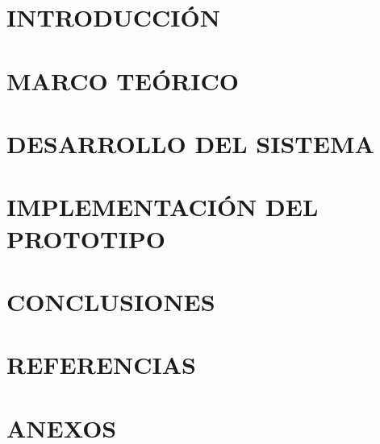 \documentclass[12pt]{article}
\begin{document}
\newpage


\setcounter{page}{1}
\renewcommand{\thepage}{\arabic{page}}

\section{INTRODUCCIÓN} \label{intro}


\newpage
\section{MARCO TEÓRICO}



\newpage
\section{DESARROLLO DEL SISTEMA}



\newpage
\section{IMPLEMENTACIÓN DEL PROTOTIPO}



\newpage
\section{CONCLUSIONES}



\newpage
\section{REFERENCIAS}



\newpage


\section{ANEXOS}


\end{document}
